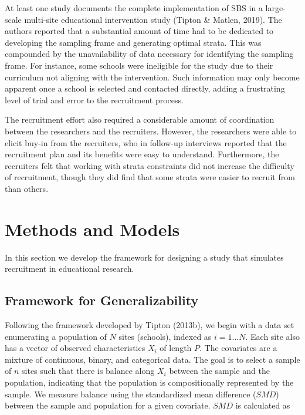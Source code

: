 \documentclass[man,floatsintext]{apa6}
\begin{document}
At least one study documents the complete implementation of SBS in a large-scale multi-site educational intervention study (Tipton \& Matlen, 2019). The authors reported that a substantial amount of time had to be dedicated to developing the sampling frame and generating optimal strata. This was compounded by the unavailability of data necessary for identifying the sampling frame. For instance, some schools were ineligible for the study due to their curriculum not aligning with the intervention. Such information may only become apparent once a school is selected and contacted directly, adding a frustrating level of trial and error to the recruitment process.

The recruitment effort also required a considerable amount of coordination between the researchers and the recruiters. However, the researchers were able to elicit buy-in from the recruiters, who in follow-up interviews reported that the recruitment plan and its benefits were easy to understand. Furthermore, the recruiters felt that working with strata constraints did not increase the difficulty of recruitment, though they did find that some strata were easier to recruit from than others.


\hypertarget{methods-and-models}{%
\section{Methods and Models}\label{methods-and-models}}

In this section we develop the framework for designing a study that simulates recruitment in educational research.

\hypertarget{framework-for-generalizability}{%
\subsection{Framework for Generalizability}\label{framework-for-generalizability}}

Following the framework developed by Tipton (2013b), we begin with a data set enumerating a population of \(N\) sites (schools), indexed as \(i = 1 ... N\). Each site also has a vector of observed characteristics \(X_i\) of length \(P\). The covariates are a mixture of continuous, binary, and categorical data. The goal is to select a sample of \(n\) sites such that there is balance along \(X_i\) between the sample and the population, indicating that the population is compositionally represented by the sample. We measure balance using the standardized mean difference (\(SMD\)) between the sample and population for a given covariate. \(SMD\) is calculated as
\end{document}
